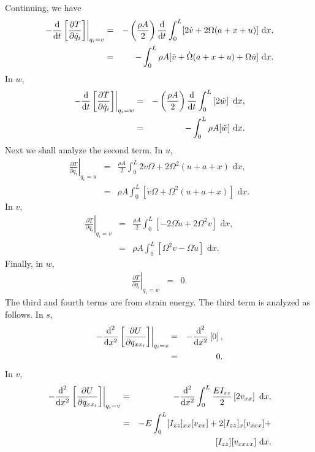 \noindent Continuing, we have
\begin{eqnarray}
\left.-\frac{\text d}{\text dt}\left[\frac{\partial T}{\partial \dot q_i}\right]\right|_{q_i=v}
&=& -\left(\frac{\rho A}{2}\right)\frac{\text d}{\text dt}\int_0^L[2\dot v+2\Omega (a+x+u)]\text{ d}x,\\
&=& -\int_0^L \rho A [\ddot v + \dot \Omega (a+x+u)+\Omega\dot u]\text{ d}x.
\end{eqnarray}
In $w$,
\begin{eqnarray}
\left.-\frac{\text d}{\text dt}\left[\frac{\partial T}{\partial \dot q_i}\right]\right|_{q_i=w}
&=& -\left(\frac{\rho A}{2}\right)\frac{\text d}{\text dt}\int_0^L\left[2\dot w \right]\text{ d}x,\\
&=& -\int_0^L \rho A [\ddot w]\text{ d}x.
\end{eqnarray}
Next we shall analyze the second term. In $u$,
\begin{eqnarray}
\left.\frac{\partial T}{\partial q_i}\right|_{q_i=u} 
&=& \frac{\rho A}{2}\int_0^L 2\dot v\Omega+2\Omega^2(u+a+x)\text{ d}x,\\
&=& \rho A\int_0^L  [\dot v\Omega+\Omega^2(u+a+x)]\text{ d}x.
\end{eqnarray}
In $v$,
\begin{eqnarray}
\left.\frac{\partial T}{\partial q_i}\right|_{q_i=v} 
&=& \frac{\rho A}{2}\int_0^L [-2\Omega\dot u+2\Omega^2v ]\text{ d}x,\\
&=& \rho A\int_0^L  [\Omega^2v-\Omega\dot u] \text{ d}x.
\end{eqnarray}
Finally, in $w$,
\begin{eqnarray}
\left.\frac{\partial T}{\partial q_i}\right|_{q_i=w} 
&=& 0.
\end{eqnarray}
The third and fourth terms are from strain energy. The third term is analyzed as follows. In $s$,
\begin{eqnarray}
\left.-\frac{\text d^2}{\text dx^2}\left[\frac{\partial U}{\partial q_{xx_i}}\right]\right|_{q_i=s} 
&=& -\frac{\text d^2}{\text dx^2}\left[ 0\right],\\
&=& 0.
\end{eqnarray}
In $v$,
\begin{eqnarray}
\left.-\frac{\text d^2}{\text dx^2}\left[\frac{\partial U}{\partial q_{xx_i}}\right]\right|_{q_i=v} 
&=& -\frac{\text d^2}{\text dx^2}\int_0^L\frac{EI_{zz}}{2}\left[ 2v_{xx} \right]\text{ d}x,\\
&=& -E\int_0^L [I_{zz}]_{xx}[v_{xx}]+2[I_{zz}]_{x}[v_{xxx}]+\\
& & \qquad [I_{zz}][v_{xxxx}]\text{ d}x. \nonumber
\end{eqnarray}
